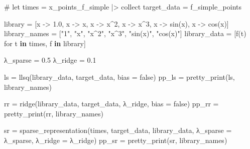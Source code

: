 \documentclass[
]{article}
\newenvironment{Shaded}{\begin{snugshade}}{\end{snugshade}}
\newcommand{\CommentTok}[1]{\textcolor[rgb]{0.37,0.37,0.37}{#1}}
\newcommand{\ConstantTok}[1]{\textcolor[rgb]{0.56,0.35,0.01}{#1}}
\newcommand{\FloatTok}[1]{\textcolor[rgb]{0.68,0.00,0.00}{#1}}
\newcommand{\FunctionTok}[1]{\textcolor[rgb]{0.28,0.35,0.67}{#1}}
\newcommand{\KeywordTok}[1]{\textcolor[rgb]{0.00,0.23,0.31}{\textbf{#1}}}
\newcommand{\NormalTok}[1]{\textcolor[rgb]{0.00,0.23,0.31}{#1}}
\newcommand{\OperatorTok}[1]{\textcolor[rgb]{0.37,0.37,0.37}{#1}}
\newcommand{\StringTok}[1]{\textcolor[rgb]{0.13,0.47,0.30}{#1}}
\begin{document}
\clearpage

\begin{Shaded}
\begin{Highlighting}[]
\CommentTok{\# let}
\NormalTok{times }\OperatorTok{=}\NormalTok{ x\_points\_f\_simple }\OperatorTok{|\textgreater{}}\NormalTok{ collect}
\NormalTok{target\_data }\OperatorTok{=}\NormalTok{ f\_simple\_points}

\NormalTok{library }\OperatorTok{=}\NormalTok{ [x }\OperatorTok{{-}\textgreater{}} \FloatTok{1.0}\NormalTok{, x }\OperatorTok{{-}\textgreater{}}\NormalTok{ x, x }\OperatorTok{{-}\textgreater{}}\NormalTok{ x}\OperatorTok{\^{}}\FloatTok{2}\NormalTok{, x }\OperatorTok{{-}\textgreater{}}\NormalTok{ x}\OperatorTok{\^{}}\FloatTok{3}\NormalTok{, x }\OperatorTok{{-}\textgreater{}} \FunctionTok{sin}\NormalTok{(x), x }\OperatorTok{{-}\textgreater{}} \FunctionTok{cos}\NormalTok{(x)]}
\NormalTok{library\_names }\OperatorTok{=}\NormalTok{ [}\StringTok{"1"}\NormalTok{, }\StringTok{"x"}\NormalTok{, }\StringTok{"x\^{}2"}\NormalTok{, }\StringTok{"x\^{}3"}\NormalTok{, }\StringTok{"sin(x)"}\NormalTok{, }\StringTok{"cos(x)"}\NormalTok{]}
\NormalTok{library\_data }\OperatorTok{=}\NormalTok{ [}\FunctionTok{f}\NormalTok{(t) for t }\KeywordTok{in}\NormalTok{ times, f }\KeywordTok{in}\NormalTok{ library]}

\NormalTok{λ\_sparse }\OperatorTok{=} \FloatTok{0.5}
\NormalTok{λ\_ridge }\OperatorTok{=} \FloatTok{0.1}

\NormalTok{ls }\OperatorTok{=} \FunctionTok{llsq}\NormalTok{(library\_data, target\_data, bias }\OperatorTok{=} \ConstantTok{false}\NormalTok{)}
\NormalTok{pp\_ls }\OperatorTok{=} \FunctionTok{pretty\_print}\NormalTok{(ls, library\_names)}

\NormalTok{rr }\OperatorTok{=} \FunctionTok{ridge}\NormalTok{(library\_data, target\_data, λ\_ridge, bias }\OperatorTok{=} \ConstantTok{false}\NormalTok{)}
\NormalTok{pp\_rr }\OperatorTok{=} \FunctionTok{pretty\_print}\NormalTok{(rr, library\_names)}

\NormalTok{sr }\OperatorTok{=} \FunctionTok{sparse\_representation}\NormalTok{(times, target\_data, library\_data, λ\_sparse }\OperatorTok{=}\NormalTok{ λ\_sparse, λ\_ridge }\OperatorTok{=}\NormalTok{ λ\_ridge)}
\NormalTok{pp\_sr }\OperatorTok{=} \FunctionTok{pretty\_print}\NormalTok{(sr, library\_names)}


\end{Highlighting}
\end{Shaded}
\end{document}
